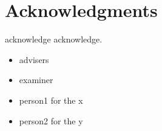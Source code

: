 \chapter{Acknowledgments}
acknowledge acknowledge.

\begin{itemize}
\item{advisers}
\item{examiner}
\item{person1 for the x}
\item{person2 for the y}
\end{itemize}
